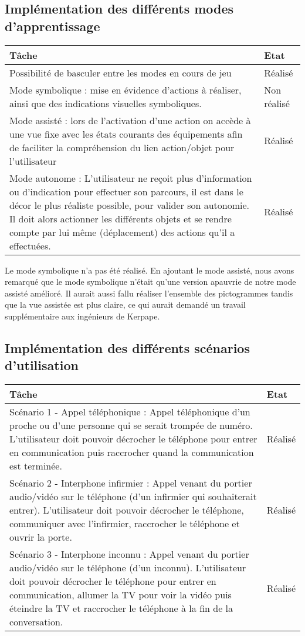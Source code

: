 \subsection{Implémentation des différents modes d'apprentissage}
\begin{tabular}{|p{}|p{}|}
	\hline
	Tâche & Etat \\ \hline
	Possibilité de basculer entre les modes en cours de jeu & Réalisé \\ \hline
	Mode symbolique : mise en évidence d'actions à réaliser, ainsi que des indications visuelles symboliques. & Non réalisé \\ \hline
	Mode assisté : lors de l'activation d'une action on accède à une vue fixe avec les états courants des équipements afin de faciliter la compréhension du lien action/objet pour l'utilisateur & Réalisé \\ \hline
	Mode autonome : L'utilisateur ne reçoit plus d'information ou d'indication pour effectuer son parcours, il est dans le décor le plus réaliste possible, pour valider son autonomie. Il doit alors actionner les différents objets et se rendre compte par lui même (déplacement) des actions qu'il a effectuées.  & Réalisé \\ \hline
\end{tabular}


Le mode symbolique n'a pas été réalisé. En ajoutant le mode assisté, nous avons remarqué que le mode symbolique n'était qu'une version apauvrie de notre mode assisté amélioré. Il aurait aussi fallu réaliser l'ensemble des pictogrammes tandis que la vue assistée est plus claire, ce qui aurait demandé un travail supplémentaire aux ingénieurs de Kerpape.

\subsection{Implémentation des différents scénarios d'utilisation}		
\begin{tabular}{|p{}|p{}|}
	\hline
	Tâche & Etat \\ \hline
	Scénario 1 - Appel téléphonique : Appel téléphonique d'un proche ou d'une personne qui se serait trompée de numéro. L'utilisateur doit pouvoir décrocher le téléphone pour entrer en communication puis raccrocher quand la communication est terminée. & Réalisé \\ \hline
	Scénario 2 - Interphone infirmier : Appel venant du portier audio/vidéo sur le téléphone (d'un infirmier qui souhaiterait entrer). L'utilisateur doit pouvoir décrocher le téléphone, communiquer avec l'infirmier, raccrocher le téléphone et ouvrir la porte.& Réalisé \\ \hline
	Scénario 3 - Interphone inconnu : Appel venant du portier audio/vidéo sur le téléphone (d'un inconnu). L'utilisateur doit pouvoir décrocher le téléphone pour entrer en communication, allumer la TV pour voir la vidéo puis éteindre la TV et raccrocher le téléphone à la fin de la conversation.& Réalisé \\ \hline
\end{tabular}
		

